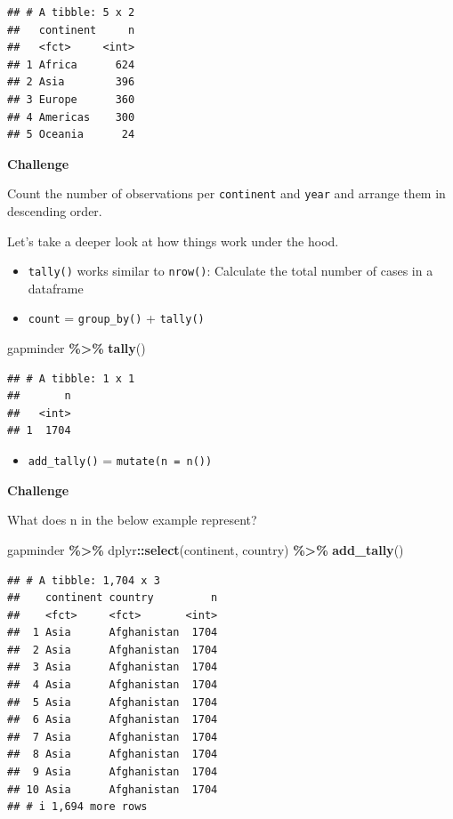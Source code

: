 \documentclass[
]{book}
\newenvironment{Shaded}{\begin{snugshade}}{\end{snugshade}}
\newcommand{\FunctionTok}[1]{\textcolor[rgb]{0.13,0.29,0.53}{\textbf{#1}}}
\newcommand{\NormalTok}[1]{#1}
\newcommand{\SpecialCharTok}[1]{\textcolor[rgb]{0.81,0.36,0.00}{\textbf{#1}}}
\providecommand{\tightlist}{%
  \setlength{\itemsep}{0pt}\setlength{\parskip}{0pt}}
\begin{document}
\begin{verbatim}
## # A tibble: 5 x 2
##   continent     n
##   <fct>     <int>
## 1 Africa      624
## 2 Asia        396
## 3 Europe      360
## 4 Americas    300
## 5 Oceania      24
\end{verbatim}

\textbf{Challenge}

Count the number of observations per \texttt{continent} and \texttt{year} and arrange them in descending order.

Let's take a deeper look at how things work under the hood.

\begin{itemize}
\item
  \texttt{tally()} works similar to \texttt{nrow()}: Calculate the total number of cases in a dataframe
\item
  \texttt{count} = \texttt{group\_by()} + \texttt{tally()}
\end{itemize}

\begin{Shaded}
\begin{Highlighting}[]
\NormalTok{gapminder }\SpecialCharTok{\%\textgreater{}\%}
  \FunctionTok{tally}\NormalTok{()}
\end{Highlighting}
\end{Shaded}

\begin{verbatim}
## # A tibble: 1 x 1
##       n
##   <int>
## 1  1704
\end{verbatim}

\begin{itemize}
\tightlist
\item
  \texttt{add\_tally()} = \texttt{mutate(n\ =\ n())}
\end{itemize}

\textbf{Challenge}

What does n in the below example represent?

\begin{Shaded}
\begin{Highlighting}[]
\NormalTok{gapminder }\SpecialCharTok{\%\textgreater{}\%}
\NormalTok{  dplyr}\SpecialCharTok{::}\FunctionTok{select}\NormalTok{(continent, country) }\SpecialCharTok{\%\textgreater{}\%}
  \FunctionTok{add\_tally}\NormalTok{()}
\end{Highlighting}
\end{Shaded}

\begin{verbatim}
## # A tibble: 1,704 x 3
##    continent country         n
##    <fct>     <fct>       <int>
##  1 Asia      Afghanistan  1704
##  2 Asia      Afghanistan  1704
##  3 Asia      Afghanistan  1704
##  4 Asia      Afghanistan  1704
##  5 Asia      Afghanistan  1704
##  6 Asia      Afghanistan  1704
##  7 Asia      Afghanistan  1704
##  8 Asia      Afghanistan  1704
##  9 Asia      Afghanistan  1704
## 10 Asia      Afghanistan  1704
## # i 1,694 more rows
\end{verbatim}
\end{document}

